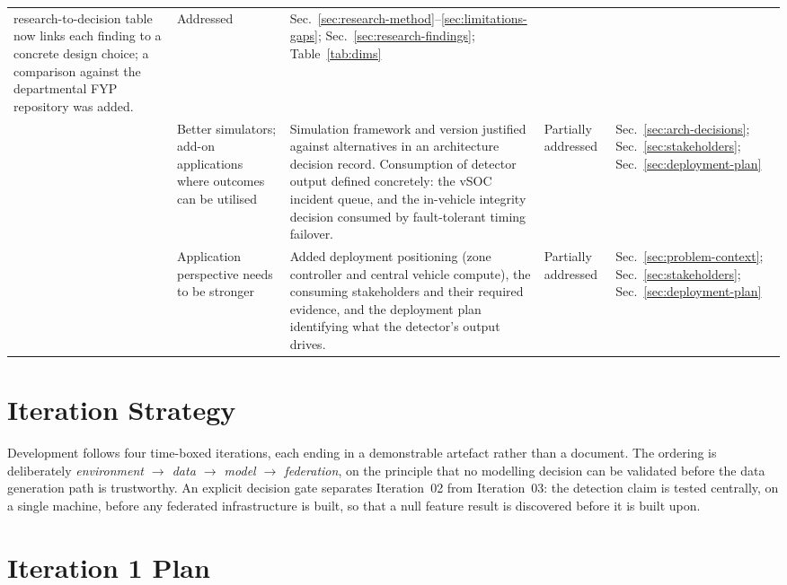 \begin{longtable}{p{} p{} p{} p{} p{}}
research-to-decision table now links each finding to a concrete design choice; a
comparison against the departmental FYP repository was added. &
Addressed &
Sec.~\ref{sec:research-method}--\ref{sec:limitations-gaps}; Sec.~\ref{sec:research-findings}; Table~\ref{tab:dims} \\
\addlinespace
5 & Better simulators; add-on applications where outcomes can be utilised &
Simulation framework and version justified against alternatives in an architecture
decision record. Consumption of detector output defined concretely: the vSOC incident
queue, and the in-vehicle integrity decision consumed by fault-tolerant timing
failover. &
Partially addressed &
Sec.~\ref{sec:arch-decisions}; Sec.~\ref{sec:stakeholders}; Sec.~\ref{sec:deployment-plan} \\
\addlinespace
6 & Application perspective needs to be stronger &
Added deployment positioning (zone controller and central vehicle compute), the
consuming stakeholders and their required evidence, and the deployment plan
identifying what the detector's output drives. &
Partially addressed &
Sec.~\ref{sec:problem-context}; Sec.~\ref{sec:stakeholders}; Sec.~\ref{sec:deployment-plan} \\
\bottomrule
\end{longtable}


\section{Iteration Strategy}
\label{sec:iteration-strategy}

Development follows four time-boxed iterations, each ending in a demonstrable
artefact rather than a document. The ordering is deliberately
\emph{environment $\rightarrow$ data $\rightarrow$ model $\rightarrow$ federation},
on the principle that no modelling decision can be validated before the data
generation path is trustworthy. An explicit decision gate separates Iteration~02 from
Iteration~03: the detection claim is tested centrally, on a single machine, before any
federated infrastructure is built, so that a null feature result is discovered before
it is built upon.

\section{Iteration 1 Plan}
\label{sec:iter1}

